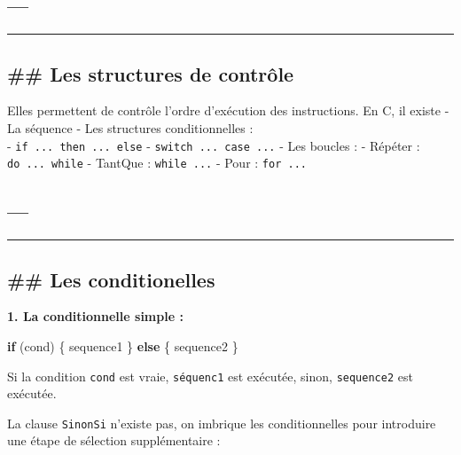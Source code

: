 \documentclass[11pt]{article}
\newenvironment{Shaded}{}{}
\newcommand{\NormalTok}[1]{{#1}}
\newcommand{\ControlFlowTok}[1]{\textcolor[rgb]{0.00,0.44,0.13}{\textbf{{#1}}}}
\begin{document}
    \hypertarget{section}{%
\subsection{---}\label{section}}

\begin{center}\rule{0.5\linewidth}{0.5pt}\end{center}

    \hypertarget{les-structures-de-contruxf4le}{%
\subsection{\#\# Les structures de
contrôle}\label{les-structures-de-contruxf4le}}

    Elles permettent de contrôle l'ordre d'exécution des instructions. En C,
il existe - La séquence - Les structures conditionnelles :\\
- \texttt{if\ ...\ then\ ...\ else} - \texttt{switch\ ...\ case\ ...} -
Les boucles : - Répéter : \texttt{do\ ...\ while} - TantQue :
\texttt{while\ ...} - Pour : \texttt{for\ ...}

    \hypertarget{section}{%
\subsection{---}\label{section}}

\begin{center}\rule{0.5\linewidth}{0.5pt}\end{center}

    \hypertarget{les-conditionelles}{%
\subsection{\#\# Les conditionelles}\label{les-conditionelles}}

    \textbf{1. La conditionnelle simple :}

\begin{Shaded}
\begin{Highlighting}[]
\ControlFlowTok{if}\NormalTok{ (cond) \{}
\NormalTok{    sequence1}
\NormalTok{\} }\ControlFlowTok{else}\NormalTok{ \{}
\NormalTok{    sequence2}
\NormalTok{\}}
\end{Highlighting}
\end{Shaded}

Si la condition \texttt{cond} est vraie, \texttt{séquenc1} est exécutée,
sinon, \texttt{sequence2} est exécutée.

La clause \texttt{SinonSi} n'existe pas, on imbrique les conditionnelles
pour introduire une étape de sélection supplémentaire :
\end{document}
